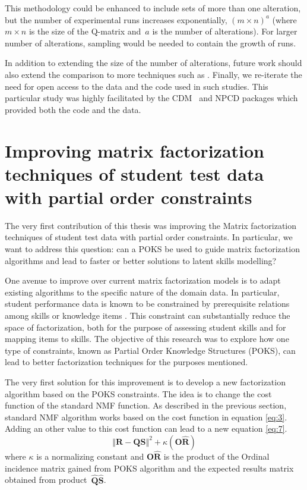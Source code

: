 This methodology could be enhanced to include sets of more than one alteration, but the number of experimental runs increases exponentially, $(m \times n)^a$ (where~$m \times n$ is the size of the Q-matrix and~$a$ is the number of alterations).  For larger number of alterations, sampling would be needed to contain the growth of runs.

In addition to extending the size of the number of alterations, future work should also extend the comparison to more techniques such as \cite{Liu01102012,loye2011validite}. Finally, we re-iterate the need for open access to the data and the code used in such studies.  This particular study was highly facilitated by the CDM~\cite{Robitzsch2012} and NPCD packages which provided both the code and the data.

\section{Improving matrix factorization techniques of student test data with partial order constraints}
\label{firstcont}

The very first contribution of this thesis was improving the Matrix factorization techniques of student test data with partial order constraints. In particular, we want to address this question: can a \ac{POKS} be used to guide matrix factorization algorithms and lead to faster or better solutions to latent skills modelling?

One avenue to improve over current matrix factorization models is to adapt existing algorithms to the specific nature of the domain data.  In particular, student performance data is known to be constrained by prerequisite relations among skills or knowledge items \cite{falmagne:1990,Doignon1999}.  This constraint can substantially reduce the space of factorization, both for the purpose of assessing student skills and for mapping items to skills.  The objective of this research was to explore how one type of constraints, known as Partial Order Knowledge Structures (POKS), can lead to better factorization techniques for the purposes mentioned.

The very first solution for this improvement is to develop a new factorization algorithm based on the \ac{POKS} constraints. The idea is to change the cost function of the standard \ac{NMF} function. As described in the previous section, standard \ac{NMF} algorithm works based on the cost function in equation \ref{eq:3}. Adding an other value to this cost function can lead to a new equation \ref{eq:7}. 
\begin{equation}
\left\Vert \mathbf{R}-\mathbf{Q}\mathbf{S}\right\Vert ^{2}+\kappa (\mathbf{O}\hat{\mathbf{R}})\label{eq:7}
\end{equation}
where $\kappa$ is a normalizing constant and $\mathbf{O}\hat{\mathbf{R}}$ is the product of the Ordinal incidence matrix gained from POKS algorithm and the expected results matrix obtained from product~$\mathbf{\hat{Q}}\mathbf{\hat{S}}$.

